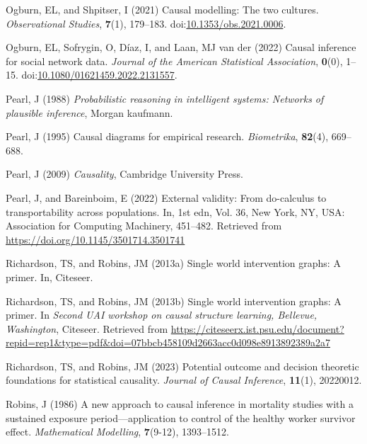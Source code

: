 \documentclass[
  single column]{article}
\newlength{\cslhangindent}
\newenvironment{CSLReferences}[2] %
 {\begin{list}{}{%
  \setlength{\itemindent}{0pt}
  \setlength{\leftmargin}{0pt}
  \setlength{\parsep}{0pt}
  \ifodd #1
   \setlength{\leftmargin}{\cslhangindent}
   \setlength{\itemindent}{-1\cslhangindent}
  \fi
  \setlength{\itemsep}{#2\baselineskip}}}
 {\end{list}}
\begin{document}
\begin{CSLReferences}{1}{0}
Ogburn, EL, and Shpitser, I (2021) Causal modelling: The two cultures.
\emph{Observational Studies}, \textbf{7}(1), 179--183.
doi:\href{https://doi.org/10.1353/obs.2021.0006}{10.1353/obs.2021.0006}.

Ogburn, EL, Sofrygin, O, Díaz, I, and Laan, MJ van der (2022) Causal
inference for social network data. \emph{Journal of the American
Statistical Association}, \textbf{0}(0), 1--15.
doi:\href{https://doi.org/10.1080/01621459.2022.2131557}{10.1080/01621459.2022.2131557}.

Pearl, J (1988) \emph{Probabilistic reasoning in intelligent systems:
Networks of plausible inference}, Morgan kaufmann.

Pearl, J (1995) Causal diagrams for empirical research.
\emph{Biometrika}, \textbf{82}(4), 669--688.

Pearl, J (2009) \emph{Causality}, Cambridge University Press.

Pearl, J, and Bareinboim, E (2022) External validity: From do-calculus
to transportability across populations. In, 1st edn, Vol. 36, New York,
NY, USA: Association for Computing Machinery, 451--482. Retrieved from
\url{https://doi.org/10.1145/3501714.3501741}

Richardson, TS, and Robins, JM (2013a) Single world intervention graphs:
A primer. In, Citeseer.

Richardson, TS, and Robins, JM (2013b) Single world intervention graphs:
A primer. In \emph{Second UAI workshop on causal structure learning,
{B}ellevue, {W}ashington}, Citeseer. Retrieved from
\url{https://citeseerx.ist.psu.edu/document?repid=rep1&type=pdf&doi=07bbcb458109d2663acc0d098e8913892389a2a7}

Richardson, TS, and Robins, JM (2023) Potential outcome and decision
theoretic foundations for statistical causality. \emph{Journal of Causal
Inference}, \textbf{11}(1), 20220012.

Robins, J (1986) A new approach to causal inference in mortality studies
with a sustained exposure period---application to control of the healthy
worker survivor effect. \emph{Mathematical Modelling}, \textbf{7}(9-12),
1393--1512.


\end{CSLReferences}
\end{document}
